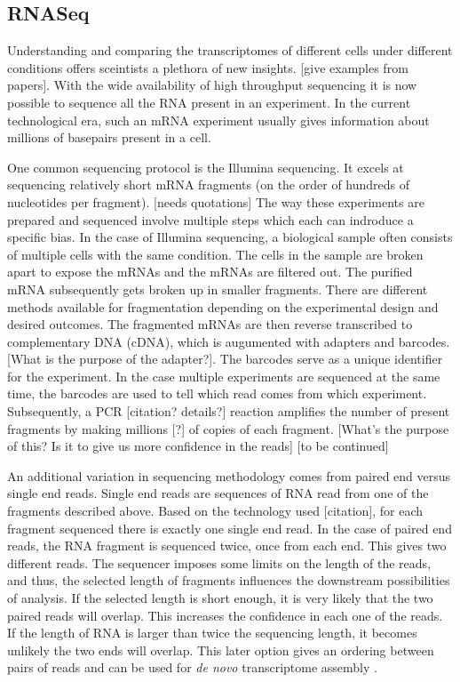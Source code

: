 \documentclass[12pt]{article}
\begin{document}
\subsection{RNASeq}
    Understanding and comparing the transcriptomes of different cells under different conditions offers sceintists a plethora of new insights. [give examples from papers]. With the wide availability of high throughput sequencing it is now possible to sequence all the RNA  present in an experiment\cite{Kukurba2015}. In the current technological era, such an mRNA experiment usually gives information about millions of basepairs present in a cell. 
    
    One common sequencing protocol is the Illumina sequencing. It excels at sequencing relatively short mRNA fragments (on the order of hundreds of nucleotides per fragment). [needs quotations] The way these experiments are prepared and sequenced involve multiple steps which each can indroduce a specific bias. In the case of Illumina sequencing, a biological sample often consists of multiple cells with the same condition. The cells in the sample are broken apart to expose the mRNAs and the mRNAs are filtered out. The purified mRNA subsequently gets broken up in smaller fragments. There are different methods available for fragmentation depending on the experimental design and desired outcomes. The fragmented mRNAs are then reverse transcribed to complementary DNA (cDNA), which is augumented with adapters and barcodes. [What is the purpose of the adapter?]. The barcodes serve as a unique identifier for the experiment. In the case multiple experiments are sequenced at the same time, the barcodes are used to tell which read comes from which experiment. Subsequently, a PCR [citation? details?] reaction amplifies the number of present fragments by making millions [?] of copies of each fragment. [What's the purpose of this? Is it to give us more confidence in the reads] [to be continued]   
    
    An additional variation in sequencing methodology comes from paired end versus single end reads. Single end reads are sequences of RNA read from one of the fragments described above. Based on the technology used [citation], for each fragment sequenced there is exactly one single end read. In the case of paired end reads, the RNA fragment is sequenced twice, once from each end. This gives two different reads. The sequencer imposes some limits on the length of the reads, and thus, the selected length of fragments influences the downstream possibilities of analysis. If the selected length is short enough, it is very likely that the two paired reads will overlap. This increases the confidence in each one of the reads. If the length of RNA is larger than twice the sequencing length, it becomes unlikely the two ends will overlap. This later option gives an ordering between pairs of reads and can be used for \textit{de novo} transcriptome assembly \cite{Hlzer2019}.
    
\end{document}
